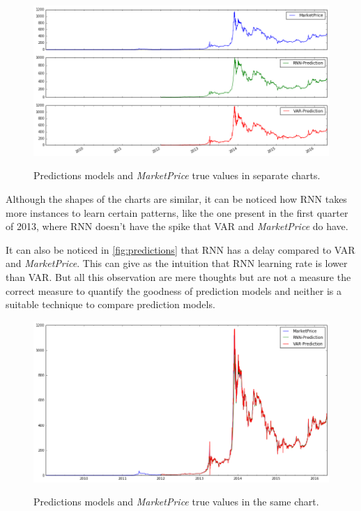 \begin{figure}[bth]
  \myfloatalign
  {\includegraphics[width=1\linewidth]
    {gfx/predictions-subplots}}
  \caption{Predictions models and \textit{MarketPrice} true values in
    separate charts.}
  \label{fig:predictions-subplots}
\end{figure}

Although the shapes of the charts are similar, it can be noticed how
RNN takes more instances to learn certain patterns, like the one
present in the first quarter of 2013, where RNN doesn't have the spike
that VAR and \textit{MarketPrice} do have.

It can also be noticed in \autoref{fig:predictions} that RNN has a
delay compared to VAR and \textit{MarketPrice}. This can give as the
intuition that RNN learning rate is lower than VAR. But all this
observation are mere thoughts but are not a measure the correct
measure to quantify the goodness of prediction models and neither is a
suitable technique to compare prediction models.

\begin{figure}[bth]
  \myfloatalign
  {\includegraphics[width=1\linewidth]
    {gfx/predictions}}
  \caption{Predictions models and \textit{MarketPrice} true values in
    the same chart.}
  \label{fig:predictions}
\end{figure}

